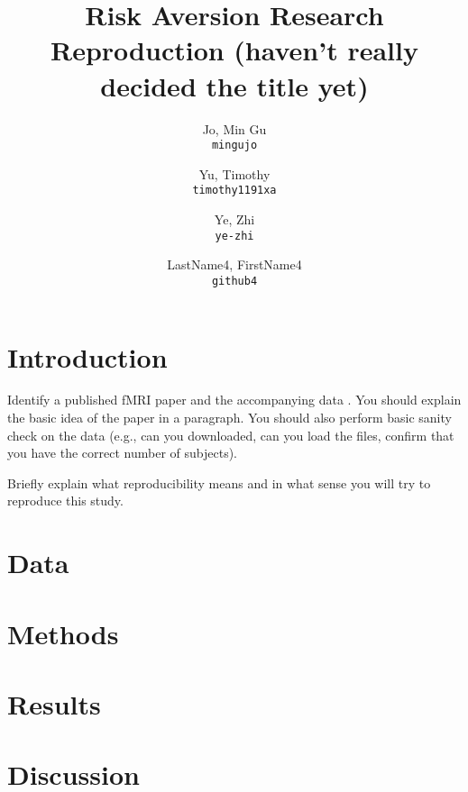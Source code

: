 \documentclass[11pt]{article}
\title{Risk Aversion Research Reproduction (haven't really decided the title yet)}
\author{
  Jo, Min Gu\\
  \texttt{mingujo}
  \and
  Yu, Timothy\\
  \texttt{timothy1191xa}
  \and
  Ye, Zhi\\
  \texttt{ye-zhi}
  \and
  LastName4, FirstName4\\
  \texttt{github4}
}
\begin{document}
\maketitle


\section{Introduction}

Identify a published fMRI paper and the accompanying data
\cite{lindquist2008statistical}.  You should explain the basic idea of the
paper in a paragraph.  You should also perform basic sanity check on the data
(e.g., can you downloaded, can you load the files, confirm that you have the
correct number of subjects).

Briefly explain what reproducibility means and in what sense you will
try to reproduce this study.

\section{Data}

\section{Methods}
\section{Results}
\section{Discussion}



\end{document}
